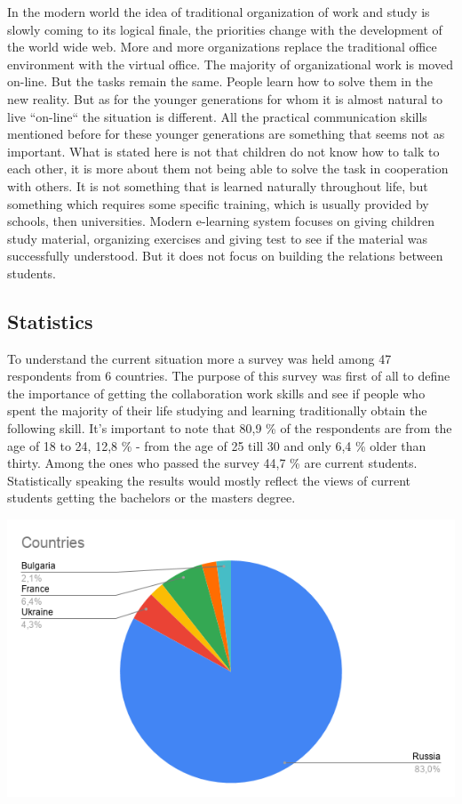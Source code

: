\documentclass[10pt,twoside,English,a4paper]{article}
\begin{document}
In the modern world the idea of traditional organization of work and study is slowly coming to its logical finale, the priorities change with the development of the world wide web. More and more organizations replace the traditional office environment with the virtual office. The majority of organizational work is moved on-line. But the tasks remain the same. People learn how to solve them in the new reality. But as for the younger generations for whom it is almost natural to live ``on-line`` the situation is different. All the practical communication skills mentioned before for these younger generations are something that seems not as important. What is stated here is not that children do not know how to talk to each other, it is more about them not being able to solve the task in cooperation with others. It is not something that is learned naturally throughout life, but something which requires some specific training, which is usually provided by schools, then universities. 
Modern e-learning system focuses on giving children study material, organizing exercises and giving test to see if the material was successfully understood. But it does not focus on building the relations between students. 

\subsection{Statistics} \label{stat}
To understand the current situation more a survey was held among 47 respondents from 6 countries. The purpose of this survey was first of all to define the importance of getting the collaboration work skills and see if people who spent the majority of their life studying and learning traditionally obtain the following skill. It's important to note that 80,9 \% of the respondents are from the age of 18 to 24, 12,8 \% - from the age of 25 till 30 and only 6,4 \% older than thirty. Among the ones who passed the survey 44,7 \% are current students. Statistically speaking the results would mostly reflect the views of current students getting the bachelors or the masters degree.

\includegraphics[width=\textwidth]{Countries.png}
\end{document}
